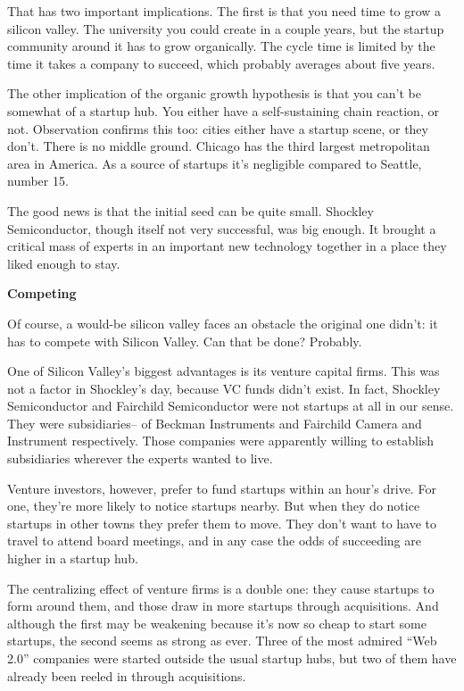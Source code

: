 That has two important implications. The first is that you need time to
grow a silicon valley. The university you could create in a couple
years, but the startup community around it has to grow organically. The
cycle time is limited by the time it takes a company to succeed, which
probably averages about five years.

The other implication of the organic growth hypothesis is that you can't
be somewhat of a startup hub. You either have a self-sustaining chain
reaction, or not. Observation confirms this too: cities either have a
startup scene, or they don't. There is no middle ground. Chicago has the
third largest metropolitan area in America. As a source of startups it's
negligible compared to Seattle, number 15.

The good news is that the initial seed can be quite small. Shockley
Semiconductor, though itself not very successful, was big enough. It
brought a critical mass of experts in an important new technology
together in a place they liked enough to stay.

\textbf{Competing}

Of course, a would-be silicon valley faces an obstacle the original one
didn't: it has to compete with Silicon Valley. Can that be done?
Probably.

One of Silicon Valley's biggest advantages is its venture capital firms.
This was not a factor in Shockley's day, because VC funds didn't exist.
In fact, Shockley Semiconductor and Fairchild Semiconductor were not
startups at all in our sense. They were subsidiaries-- of Beckman
Instruments and Fairchild Camera and Instrument respectively. Those
companies were apparently willing to establish subsidiaries wherever the
experts wanted to live.

Venture investors, however, prefer to fund startups within an hour's
drive. For one, they're more likely to notice startups nearby. But when
they do notice startups in other towns they prefer them to move. They
don't want to have to travel to attend board meetings, and in any case
the odds of succeeding are higher in a startup hub.

The centralizing effect of venture firms is a double one: they cause
startups to form around them, and those draw in more startups through
acquisitions. And although the first may be weakening because it's now
so cheap to start some startups, the second seems as strong as ever.
Three of the most admired ``Web 2.0'' companies were started outside the
usual startup hubs, but two of them have already been reeled in through
acquisitions.

